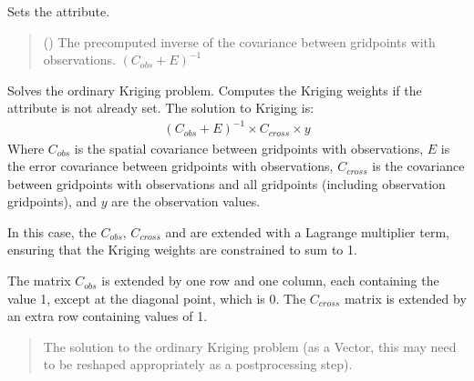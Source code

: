 \documentclass[letterpaper,10pt,english]{sphinxmanual}
\begin{document}
\begin{fulllineitems}
\begin{fulllineitems}
\sphinxAtStartPar
Sets the  attribute.
\begin{quote}\begin{description}
\sphinxAtStartPar
{} () \textendash{} The pre\sphinxhyphen{}computed inverse of the covariance between grid\sphinxhyphen{}points with
observations. \((C_{obs} + E)^{-1}\)

\sphinxAtStartPar
{}

\end{description}\end{quote}

\end{fulllineitems}


\begin{fulllineitems}
\label{\detokenize{kriging:glomar_gridding.kriging.OrdinaryKriging.solve}}
\pysigstartsignatures
\pysiglinewithargsret
{}
{}
{}
\pysigstopsignatures
\sphinxAtStartPar
Solves the ordinary Kriging problem. Computes the Kriging weights if the
 attribute is not already set. The solution to Kriging
is:
\begin{equation*}
\begin{split}(C_{obs} + E)^{-1} \times C_{cross} \times y\end{split}
\end{equation*}
\sphinxAtStartPar
Where \(C_{obs}\) is the spatial covariance between grid\sphinxhyphen{}points
with observations, \(E\) is the error covariance between grid\sphinxhyphen{}points
with observations, \(C_{cross}\) is the covariance between
grid\sphinxhyphen{}points with observations and all grid\sphinxhyphen{}points (including observation
grid\sphinxhyphen{}points), and \(y\) are the observation values.

\sphinxAtStartPar
In this case, the \(C_{obs}\), \(C_{cross}\) and are extended
with a Lagrange multiplier term, ensuring that the Kriging weights are
constrained to sum to 1.

\sphinxAtStartPar
The matrix \(C_{obs}\) is extended by one row and one column, each
containing the value 1, except at the diagonal point, which is 0. The
\(C_{cross}\) matrix is extended by an extra row containing values
of 1.
\begin{quote}\begin{description}
\sphinxAtStartPar
The solution to the ordinary Kriging problem (as a Vector, this may
need to be re\sphinxhyphen{}shaped appropriately as a post\sphinxhyphen{}processing step).


\end{description}
\end{quote}
\end{fulllineitems}
\end{fulllineitems}
\end{document}
